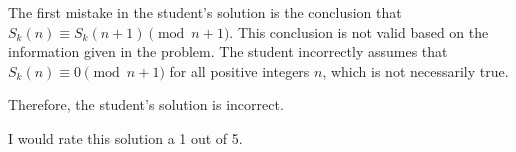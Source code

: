 The first mistake in the student's solution is the conclusion that $S_k(n) \equiv S_k(n+1) \pmod{n+1}$. This conclusion is not valid based on the information given in the problem. The student incorrectly assumes that $S_k(n) \equiv 0 \pmod{n+1}$ for all positive integers $n$, which is not necessarily true.

Therefore, the student's solution is incorrect.

I would rate this solution a 1 out of 5.
